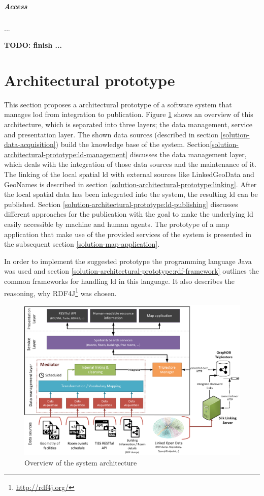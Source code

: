 \documentclass[draft,final]{vutinfth} %
\newcommand{\todo}[1]{{\color{red}\textbf{TODO: {#1}}}} %
\begin{document}
\subparagraph{Access} ...

\todo{finish ... }

\section{Architectural prototype}
\label{solution-architectural-prototype}

This section proposes a architectural prototype of a software system that manages \gls{lod} from integration to publication. Figure \ref{fig:solution-architectural-prototype} shows an overview of this architecture, which is separated into three layers; the data management, service and presentation layer. The shown data sources (described in section \ref{solution-data-acquisition}) build the knowledge base of the system. Section\ref{solution-architectural-prototype:ld-management} discusses the data management layer, which deals with the integration of those data sources and the maintenance of it. The linking of the local spatial \gls{ld} with external sources like LinkedGeoData and GeoNames is described in section \ref{solution-architectural-prototype:linking}. After the local spatial data has been integrated into the system, the resulting \gls{ld} can be published. Section \ref{solution-architectural-prototype:ld-publishing} discusses different approaches for the publication with the goal to make the underlying \gls{ld} easily accessible by machine and human agents. The prototype of a map application that make use of the provided services of the system is presented in the subsequent section \ref{solution-map-application}.   

In order to implement the suggested prototype the programming language Java was used and section \ref{solution-architectural-prototype:rdf-framework} outlines the common frameworks for handling \gls{ld} in this language. It also describes the reasoning, why RDF4J\footnote{\url{http://rdf4j.org/}} was chosen.

\begin{figure}[h]
    \centering
    \includegraphics[width=1.0\textwidth]{graphics/finderArchitecture.png}
    \caption{Overview of the system architecture}
    \label{fig:solution-architectural-prototype}
\end{figure}
\end{document}
